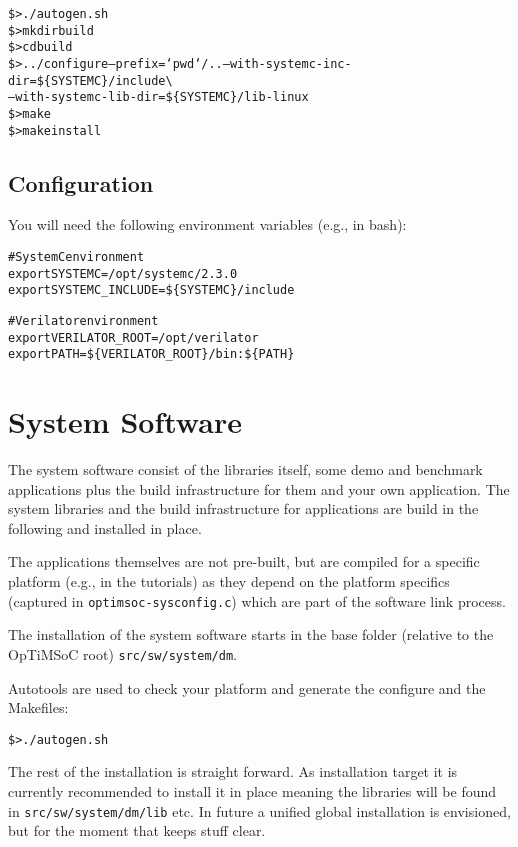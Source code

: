\begin{alltt}
\$> ./autogen.sh
\$> mkdir build
\$> cd build
\$> ../configure --prefix=`pwd`/.. --with-systemc-inc-dir=\$\{SYSTEMC\}/include \textbackslash
      --with-systemc-lib-dir=\$\{SYSTEMC\}/lib-linux
\$> make
\$> make install
\end{alltt}

\subsection{Configuration}

You will need the following environment variables (e.g., in bash):

\begin{alltt}
# SystemC environment
export SYSTEMC=/opt/systemc/2.3.0
export SYSTEMC_INCLUDE=\$\{SYSTEMC\}/include

# Verilator environment
export VERILATOR\_ROOT=/opt/verilator
export PATH=\$\{VERILATOR_ROOT\}/bin:\$\{PATH\}
\end{alltt}

\section{System Software}

The system software consist of the libraries itself, some demo and
benchmark applications plus the build infrastructure for them and your
own application. The system libraries and the build infrastructure for
applications are build in the following and installed in place.

The applications themselves are not pre-built, but are compiled for a
specific platform (e.g., in the tutorials) as they depend on the
platform specifics (captured in \verb|optimsoc-sysconfig.c|) which are
part of the software link process.

The installation of the system software starts in the base folder
(relative to the OpTiMSoC root) \verb|src/sw/system/dm|.

Autotools are used to check your platform and generate the configure
and the Makefiles:

\begin{alltt}
\$> ./autogen.sh
\end{alltt}

The rest of the installation is straight forward. As installation
target it is currently recommended to install it in place meaning the
libraries will be found in \verb|src/sw/system/dm/lib| etc. In future
a unified global installation is envisioned, but for the moment that
keeps stuff clear.

